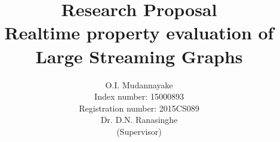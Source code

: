 \title{
    \vspace{-1.0cm}
    {\LARGE Research Proposal}\\
    \vspace{0.3cm}
    {\Huge\textbf{Realtime property evaluation of\\Large Streaming Graphs}}
    \vspace{3cm}
}

\author{
    O.I. Mudannayake\\
    {\normalsize Index number: 15000893}\\
    {\normalsize Registration number: 2015CS089}
    \vspace{1cm}
    \\Dr. D.N. Ranasinghe\\
    {\normalsize(Supervisor)}\\
    \vspace{1cm}
}

\date{}

\usepackage{titlepic}
